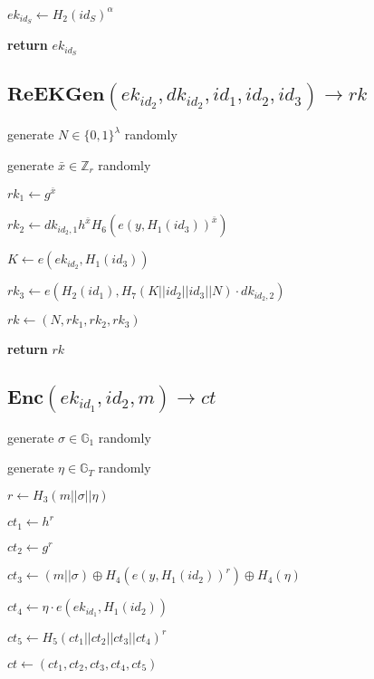 \documentclass[a4paper]{article}
\begin{document}
$\textit{ek}_{\textit{id}_S} \gets H_2(\textit{id}_S)^\alpha$

\textbf{return} $\textit{ek}_{\textit{id}_S}$

\subsection{$\textbf{ReEKGen}(\textit{ek}_{\textit{id}_2}, \textit{dk}_{\textit{id}_2}, \textit{id}_1, \textit{id}_2, \textit{id}_3) \rightarrow \textit{rk}$}

generate $N \in \{0, 1\}^\lambda$ randomly

generate $\bar{x} \in \mathbb{Z}_r$ randomly

$\textit{rk}_1 \gets g^{\bar{x}}$

$\textit{rk}_2 \gets \textit{dk}_{\textit{id}_2, 1} h^{\bar{x}} H_6(e(y, H_1(\textit{id}_3))^{\bar{x}})$

$K \gets e(\textit{ek}_{\textit{id}_2}, H_1(\textit{id}_3))$

$\textit{rk}_3 \gets e(
H_2(\textit{id}_1), 
H_7(K || \textit{id}_2 || \textit{id}_3 || N) \cdot \textit{dk}_{\textit{id}_2, 2}
)$

$\textit{rk} \gets (N, \textit{rk}_1, \textit{rk}_2, \textit{rk}_3)$

\textbf{return} $\textit{rk}$

\subsection{$\textbf{Enc}(\textit{ek}_{\textit{id}_1}, \textit{id}_2, m) \rightarrow \textit{ct}$}

generate $\sigma \in \mathbb{G}_1$ randomly

generate $\eta \in \mathbb{G}_T$ randomly

$r \gets H_3(m || \sigma || \eta)$

$\textit{ct}_1 \gets h^r$

$\textit{ct}_2 \gets g^r$

$\textit{ct}_3 \gets (m || \sigma) \oplus H_4(e(y, H_1(\textit{id}_2))^r) \oplus H_4(\eta)$

$\textit{ct}_4 \gets \eta \cdot e(\textit{ek}_{\textit{id}_1}, H_1(\textit{id}_2))$

$\textit{ct}_5 \gets H_5(\textit{ct}_1 || \textit{ct}_2 || \textit{ct}_3 || \textit{ct}_4)^r$

$\textit{ct} \gets (\textit{ct}_1, \textit{ct}_2, \textit{ct}_3, \textit{ct}_4, \textit{ct}_5)$
\end{document}
